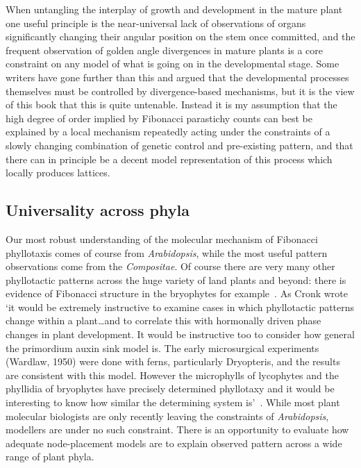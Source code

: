 When untangling the interplay of growth and development in the mature plant one useful principle is the near-universal lack of observations of organs significantly changing their angular position on the stem once committed, and the frequent observation of golden angle divergences in mature plants is a core constraint on any model of what is going on in the developmental stage. Some writers have gone further than this and argued that the developmental processes themselves must be controlled by divergence-based mechanisms, but it is the view of this book that this is quite untenable.  Instead it is my assumption that the high degree of order implied by Fibonacci parastichy counts can best be explained by a local mechanism repeatedly acting under the constraints of a slowly changing combination of genetic control and pre-existing pattern, and that there can in principle be a decent model representation of this process which locally produces lattices. 

\subsection{Universality across phyla}
Our most robust understanding of the molecular mechanism of Fibonacci phyllotaxis comes of course from \textit{Arabidopsis}, while the most useful pattern observations come from the \textit{Compositae}. Of course there are very many other phyllotactic patterns across the huge variety of land plants and beyond: there is evidence of Fibonacci structure in the bryophytes for example~\cite{gomez-campoPhyllotacticPatternsBryophyllum1974}. As Cronk wrote `it would be extremely instructive to examine cases in which phyllotactic patterns change within a plant\ldots and to correlate this with hormonally driven phase changes in plant development. It would be instructive too to consider how general the primordium auxin sink model is. The early microsurgical experiments (Wardlaw, 1950) were done with ferns, particularly Dryopteris, and the results are consistent with this model. However the microphylls of lycophytes and the phyllidia of bryophytes have precisely determined phyllotaxy and it would be interesting to know how similar the determining system is'~\autocite[p120]{cronkMolecularOrganographyPlants2009}. 
While most plant molecular biologists are only recently leaving the constraints of  \textit{Arabidopsis}, modellers are under no such constraint.
There is an opportunity to evaluate how adequate node-placement models are to explain observed pattern  across a wide range of plant phyla.

